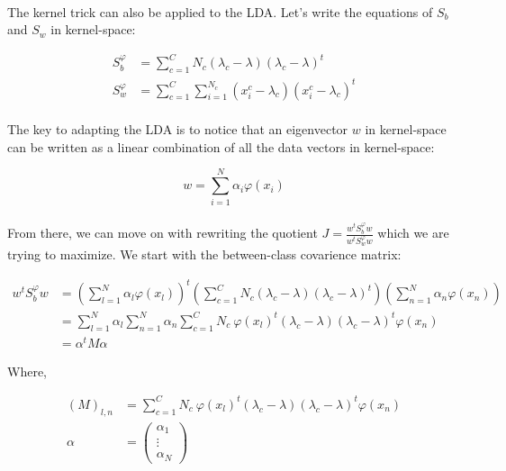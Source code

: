 \paragraph{}
The kernel trick can also be applied to the LDA. Let's write the equations of $S_b$ and $S_w$ in kernel-space:

\begin{align*}
S_b^\varphi &= \sum_{c = 1}^C N_c(\lambda_c - \lambda)(\lambda_c - \lambda)^t \\
S_w^\varphi &= \sum_{c = 1}^{C}\sum_{i = 1}^{N_c} (x_i^c - \lambda_c)(x_i^c - \lambda_c)^t
\end{align*}

\paragraph{}
The key to adapting the LDA is to notice that an eigenvector $w$ in kernel-space can be written as a
linear combination of all the data vectors in kernel-space:

\begin{equation}
\label{eq:phibase}
w = \sum_{i=1}^N \alpha_i \varphi(x_i)
\end{equation}

\paragraph{}
From there, we can move on with rewriting the quotient $J = \frac{w^tS_b^\varphi w}{w^tS_w^\varphi w}$ which we are
trying to maximize. We start with the between-class covarience matrix:

\begin{align*}
w^tS_b^\varphi w &= \left( \sum_{l=1}^N \alpha_l \varphi(x_l)\right)^t
            \left( \sum_{c=1}^C N_c(\lambda_c - \lambda)(\lambda_c - \lambda)^t\right)
            \left( \sum_{n=1}^N \alpha_n \varphi(x_n)\right) \\
&= \sum_{l=1}^N\alpha_l \sum_{n=1}^N \alpha_n \sum_{c =1}^C
                N_c ~\varphi(x_l)^t(\lambda_c - \lambda)(\lambda_c - \lambda)^t\varphi(x_n) \\
                &= \alpha^tM\alpha
\end{align*}

Where,

\begin{align*}
(M)_{l,n} &= \sum_{c=1}^C N_c ~\varphi(x_l)^t (\lambda_c - \lambda)(\lambda_c -\lambda)^t \varphi(x_n) \\
\alpha &= \left( \begin{array}{c}
                                \alpha_1 \\
                                \vdots \\
                                \alpha_N
                  \end{array}  \right) 
\end{align*}

